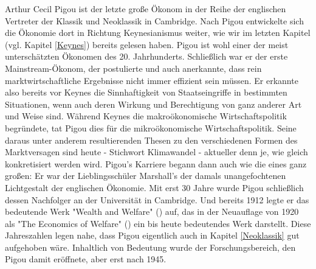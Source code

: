 Arthur Cecil Pigou ist der letzte große Ökonom in der Reihe der englischen Vertreter der Klassik und Neoklassik in Cambridge. Nach Pigou entwickelte sich die Ökonomie dort in Richtung Keynesianismus weiter, wie wir im letzten Kapitel (vgl. Kapitel \ref{Keynes}) bereits gelesen haben. Pigou ist wohl einer der meist unterschätzten Ökonomen des 20. Jahrhunderts. Schließlich war er der erste Mainstream-Ökonom, der postulierte und auch anerkannte, dass rein marktwirtschaftliche Ergebnisse nicht immer effizient sein müssen. Er erkannte also bereits vor Keynes die Sinnhaftigkeit von Staatseingriffe in bestimmten Situationen, wenn auch deren Wirkung und Berechtigung von ganz anderer Art und Weise sind. Während Keynes die makroökonomische Wirtschaftspolitik begründete, tat Pigou dies für die mikroökonomische Wirtschaftspolitik. Seine daraus unter anderem resultierenden Thesen zu den verschiedenen Formen des Marktversagen sind heute - Stichwort Klimawandel - aktueller denn je, wie gleich konkretisiert werden wird. Pigou's Karriere begann dann auch wie die eines ganz großen: Er war der Lieblingsschüler Marshall's der damals unangefochtenen Lichtgestalt der englischen Ökonomie. Mit erst 30 Jahre wurde Pigou schließlich dessen Nachfolger an der Universität in Cambridge. Und bereits 1912 legte er das bedeutende Werk "Wealth and Welfare" (\parencite{Pigou1912}) auf, das in der Neuauflage von 1920 als "The Economics of Welfare" (\parencite{Pigou1920}) ein bis heute bedeutendes Werk darstellt. Diese Jahreszahlen legen nahe, dass Pigou eigentlich auch in Kapitel \ref{Neoklassik} gut aufgehoben wäre. Inhaltlich von Bedeutung wurde der Forschungsbereich, den Pigou damit eröffnete, aber erst nach 1945. 

